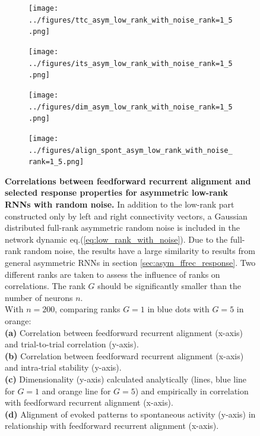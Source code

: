 \documentclass[11pt]{article}
\begin{document}
		\begin{figure}
			\centering
			\begin{subfigure}[b]{0.45\textwidth}
				\centering
				\texttt{[image: ../figures/ttc\_asym\_low\_rank\_with\_noise\_rank=1\_5.png]}
				\caption{}
			\end{subfigure}
			\hfill
			\begin{subfigure}[b]{0.45\textwidth}
				\centering
				\texttt{[image: ../figures/its\_asym\_low\_rank\_with\_noise\_rank=1\_5.png]}
				\caption{}
			\end{subfigure}
			\newline
			\begin{subfigure}[b]{0.45\textwidth}
				\centering
				\texttt{[image: ../figures/dim\_asym\_low\_rank\_with\_noise\_rank=1\_5.png]}
				\caption{}
			\end{subfigure}
			\hfill
			\begin{subfigure}[b]{0.45\textwidth}
				\centering
				\texttt{[image: ../figures/align\_spont\_asym\_low\_rank\_with\_noise\_rank=1\_5.png]}
				\caption{}
			\end{subfigure}
		\caption{\textbf{Correlations between feedforward recurrent alignment and selected response properties for asymmetric low-rank RNNs with random noise.} In addition to the low-rank part constructed only by left and right connectivity vectors, a Gaussian distributed full-rank asymmetric random noise is included in the network dynamic eq.(\ref{eq:low_rank_with_noise}). Due to the full-rank random noise, the results have a large similarity to results from general asymmetric RNNs in section \ref{sec:asym_ffrec_response}. Two different ranks are taken to assess the influence of ranks on correlations. The rank $G$ should be significantly smaller than the number of neurons $n$. \\
		With $n = 200$, comparing ranks $G = 1$ in blue dots with $G=5$ in orange:\\
		\textbf{(a)} Correlation between feedforward recurrent alignment (x-axis) and trial-to-trial correlation (y-axis). \\
		\textbf{(b)} Correlation between feedforward recurrent alignment (x-axis) and intra-trial stability (y-axis). \\
		\textbf{(c)} Dimensionality (y-axis) calculated analytically (lines, blue line for $G=1$ and orange line for $G=5$) and empirically in correlation with feedforward recurrent alignment (x-axis).\\
		\textbf{(d)} Alignment of evoked patterns to spontaneous activity (y-axis) in relationship with feedforward recurrent alignment (x-axis).}
		\label{fig:result_asym_low_rank_with_noise}
		\end{figure}
 
\end{document}
